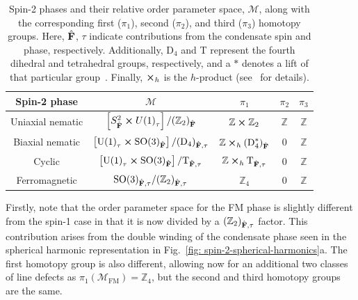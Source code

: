 \begin{table}
    \centering
    \begin{tabular}{ccccc}
        \toprule
        Spin-2 phase & \(\mathcal{M}\) & \(\pi_1\) & \(\pi_2\) & \(\pi_3\) \\
        \midrule
        Uniaxial nematic & \(\left[S^2_{\hat{\vb{F}}} \cross {U(1)}_\tau\right]
        / {({\mathbb{Z}}_2)}_{\hat{\vb{F}}} \)
        & \(\mathbb{Z} \cross \mathbb{Z}_2\)
        & \(\mathbb{Z}\) & \(\mathbb{Z} \) \\
        Biaxial nematic & \(\left[{\text{U}(1)}_\tau \cross
        {\text{SO}(3)}_{\hat{\vb{F}}}\right]
        / {(\text{D}_4)}_{\hat{\vb{F}}, \tau}\)
        & \(\mathbb{Z} \cross_h {(\text{D}^\ast_4)}_{\hat{\vb{F}}}\) & 0
        & \(\mathbb{Z}\) \\
        Cyclic & \(\left[{\text{U}(1)}_\tau
        \cross {\text{SO}(3)}_{\hat{\vb{F}}}\right]
        / \text{T}_{\hat{\vb{F}}, \tau}\)
        & \(\mathbb{Z} \cross_h \text{T}_{\hat{\vb{F}}, \tau}\) & 0
        & \(\mathbb{Z}\) \\
        Ferromagnetic & \({\text{SO}(3)}_{\hat{\vb{F}}, \tau}
        / {({\mathbb{Z}}_2)}_{\hat{\vb{F}}, \tau}\)
        & \({\mathbb{Z}}_4\) & 0 & \(\mathbb{Z}\) \\
        \bottomrule
    \end{tabular}
    \caption[Order parameter spaces and first three homotopy groups for spin-2
    BECs]{\label{tab: spin-2-homotopy-groups}Spin-2 phases and their relative
    order parameter space, \(\mathcal{M}\), along with the corresponding first
    (\(\pi_1\)), second (\(\pi_2\)), and third (\(\pi_3\)) homotopy groups.
    Here, \(\hat{\vb{F}}\), \(\tau \) indicate contributions from the
    condensate spin and phase, respectively.
    Additionally, \(\text{D}_4\) and T represent the fourth dihedral and
    tetrahedral groups, respectively, and a \(\ast \) denotes a lift of that
    particular group~\cite{Mermin1979}.
    Finally, \(\cross_h\) is the \(h\)-product (see~\cite{Kobayashi2012} for
    details).}
\end{table}

Firstly, note that the order parameter space for the FM phase is slightly
different from the spin-1 case in that it is now divided by a
\({(\mathbb{Z}_2)}_{\hat{\vb{F}}, \tau}\) factor.
This contribution arises from the double winding of the condensate phase seen in
the spherical harmonic representation in
Fig.~\ref{fig: spin-2-spherical-harmonics}a.
The first homotopy group is also different, allowing now for an additional two
classes of line defects as \(\pi_1(\mathcal{M}_\text{FM}) = \mathbb{Z}_4\), but
the second and third homotopy groups are the same.

